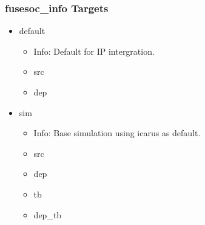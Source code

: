 \subsubsection{fusesoc\_info Targets}
\begin{itemize}
\item default
	\begin{itemize}
	\item[$\space$] Info: Default for IP intergration.
	\item src
	\item dep
	\end{itemize}
\item sim
	\begin{itemize}
	\item[$\space$] Info: Base simulation using icarus as default.
	\item src
	\item dep
	\item tb
	\item dep\_tb
	\end{itemize}
\end{itemize}
